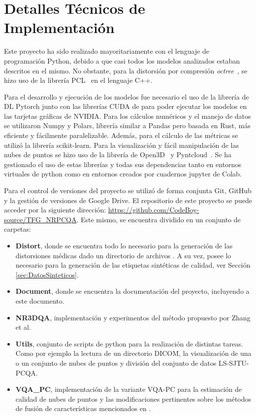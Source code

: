 \section*{Detalles Técnicos de Implementación} 
\label{sec:Implementacion}
Este proyecto ha sido realizado mayoritariamente con el lenguaje de programación Python, 
debido a que casi todos los modelos analizados estaban descritos en el mismo.
No obstante, para la distorsión por compresión \emph{octree}~\cite{OctreeCompression}, 
se hizo uso de la librería PCL~\cite{PCL} en el lenguaje C++.

Para el desarrollo y ejecución de los modelos fue necesario el uso de
la librería de DL Pytorch junto con las librerías CUDA de para poder ejecutar 
los modelos en las tarjetas gráficas de NVIDIA. Para los cálculos numéricos y 
el manejo de datos se utilizaron Numpy y Polars, librería similar a Pandas 
pero basada en Rust, más eficiente y fácilmente paralelizable. Además, para el
cálculo de las métricas se utilizó la librería scikit-learn.
Para la visualización y fácil manipulación de las nubes de puntos se hizo uso 
de la librería de Open3D~\cite{Open3D} y Pyntcloud~\cite{Pyntcloud}.
Se ha gestionado el uso de estas librerías y todas sus dependencias tanto en entornos virtuales 
de python como en entornos creados por cuadernos jupyter de Colab.

Para el control de versiones del proyecto se utilizó de forma conjunta Git, GitHub
y la gestión de versiones de Google Drive. El repositorio de este proyecto se 
puede acceder por la siguiente dirección: \url{https://github.com/CodeBoy-source/TFG_NRPCQA}.
Este mismo, se encuentra dividido en un conjunto de carpetas: 
\begin{itemize}
  \item \textbf{Distort}, donde se encuentra todo lo necesario para la generación 
    de las distorsiones médicas dado un directorio de archivos . 
    A su vez, posee lo necesario para la generación de las etiquetas sintéticas 
    de calidad, ver Sección \ref{sec:DatosSinteticos}.
  \item \textbf{Document}, donde se encuentra la documentación del proyecto, 
    incluyendo a este documento. 
  \item \textbf{NR3DQA}, implementación y experimentos del método propuesto 
    por Zhang et al\cite{NR3DQA}.
  \item \textbf{Utils}, conjunto de scripts de python para la realización de distintas 
    tareas. Como por ejemplo la lectura de un directorio DICOM, la visualización 
    de una o un conjunto de nubes de puntos y división del conjunto de datos LS-SJTU-PCQA\cite{ResSCNN}.
  \item \textbf{VQA\_PC}, implementación de la variante VQA-PC\cite{VQA-PC} para 
    la estimación de calidad de nubes de puntos y las modificaciones pertinentes 
    sobre los métodos de fusión de características mencionados en \cite{EnsemblePCQA}. 
\end{itemize}
